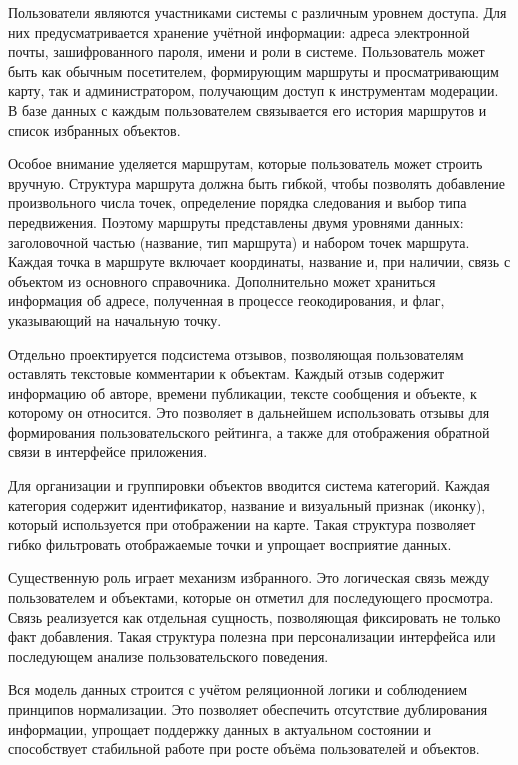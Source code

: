 Пользователи являются участниками системы с различным уровнем доступа. Для них предусматривается хранение учётной информации: адреса электронной почты, зашифрованного пароля, имени и роли в системе. Пользователь может быть как обычным посетителем, формирующим маршруты и просматривающим карту, так и администратором, получающим доступ к инструментам модерации. В базе данных с каждым пользователем связывается его история маршрутов и список избранных объектов.

Особое внимание уделяется маршрутам, которые пользователь может строить вручную. Структура маршрута должна быть гибкой, чтобы позволять добавление произвольного числа точек, определение порядка следования и выбор типа передвижения. Поэтому маршруты представлены двумя уровнями данных: заголовочной частью (название, тип маршрута) и набором точек маршрута. Каждая точка в маршруте включает координаты, название и, при наличии, связь с объектом из основного справочника. Дополнительно может храниться информация об адресе, полученная в процессе геокодирования, и флаг, указывающий на начальную точку.

Отдельно проектируется подсистема отзывов, позволяющая пользователям оставлять текстовые комментарии к объектам. Каждый отзыв содержит информацию об авторе, времени публикации, тексте сообщения и объекте, к которому он относится. Это позволяет в дальнейшем использовать отзывы для формирования пользовательского рейтинга, а также для отображения обратной связи в интерфейсе приложения.

Для организации и группировки объектов вводится система категорий. Каждая категория содержит идентификатор, название и визуальный признак (иконку), который используется при отображении на карте. Такая структура позволяет гибко фильтровать отображаемые точки и упрощает восприятие данных.

Существенную роль играет механизм избранного. Это логическая связь между пользователем и объектами, которые он отметил для последующего просмотра. Связь реализуется как отдельная сущность, позволяющая фиксировать не только факт добавления. Такая структура полезна при персонализации интерфейса или последующем анализе пользовательского поведения.

Вся модель данных строится с учётом реляционной логики и соблюдением принципов нормализации. Это позволяет обеспечить отсутствие дублирования информации, упрощает поддержку данных в актуальном состоянии и способствует стабильной работе при росте объёма пользователей и объектов.

